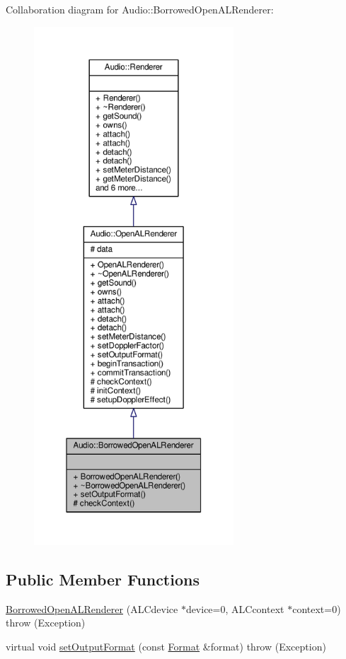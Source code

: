 Collaboration diagram for Audio\+:\+:Borrowed\+Open\+A\+L\+Renderer\+:
\nopagebreak
\begin{figure}[H]
\begin{center}
\leavevmode
\includegraphics[height=550pt]{d2/d12/classAudio_1_1BorrowedOpenALRenderer__coll__graph}
\end{center}
\end{figure}
\subsection*{Public Member Functions}
\begin{DoxyCompactItemize}
\item 
\hyperlink{classAudio_1_1BorrowedOpenALRenderer_a450cc345a7d4a9571fbc70090753def6}{Borrowed\+Open\+A\+L\+Renderer} (A\+L\+Cdevice $\ast$device=0, A\+L\+Ccontext $\ast$context=0)  throw (\+Exception)
\item 
virtual void \hyperlink{classAudio_1_1BorrowedOpenALRenderer_a67db564a97a04c1efc4840e3bd5947ad}{set\+Output\+Format} (const \hyperlink{structAudio_1_1Format}{Format} \&format)  throw (\+Exception)
\end{DoxyCompactItemize}
